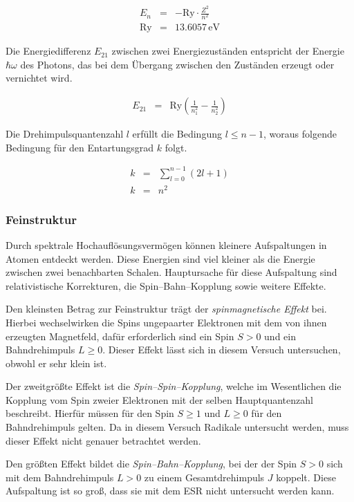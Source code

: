 \documentclass[12pt,a4paper]{scrartcl}
\numberwithin{equation}{section} %
\begin{document}
\begin{eqnarray}
	E_n &=& - \mathrm{Ry} \cdot \frac{Z^2}{n^2} \\
	\mathrm{Ry} &=& 13.6057 \mathrm{\,eV}
\end{eqnarray}

\noindent
Die Energiedifferenz $E_{21}$ zwischen zwei Energiezuständen entspricht der Energie $\hbar\omega$ des Photons, das bei dem Übergang zwischen den Zuständen erzeugt oder vernichtet wird.

\begin{eqnarray}
	E_{21} &=& \mathrm{Ry} \left( \frac{1}{n_1^2} - \frac{1}{n_2^2} \right)
\end{eqnarray}

\noindent
Die Drehimpulsquantenzahl $l$ erfüllt die Bedingung $l \leq n - 1$, woraus folgende Bedingung für den Entartungsgrad $k$ folgt.

\begin{eqnarray}
	k &=& \sum_{l=0}^{n-1} (2l+1) \\
	k &=& n^2
\end{eqnarray}

\subsubsection{Feinstruktur}
Durch spektrale Hochauflösungsvermögen können kleinere Aufspaltungen in Atomen entdeckt werden. Diese Energien sind viel kleiner als die Energie zwischen zwei benachbarten Schalen. Hauptursache für diese Aufspaltung sind relativistische Korrekturen, die Spin--Bahn--Kopplung sowie weitere Effekte. \cite{Weber}

Den kleinsten Betrag zur Feinstruktur trägt der \emph{spinmagnetische Effekt} bei. Hierbei wechselwirken die Spins ungepaarter Elektronen mit dem von ihnen erzeugten Magnetfeld, dafür erforderlich sind ein Spin $S>0$ und ein Bahndrehimpuls $L\geq 0$. Dieser Effekt lässt sich in diesem Versuch untersuchen, obwohl er sehr klein ist.

Der zweitgrößte Effekt ist die \emph{Spin--Spin--Kopplung}, welche im Wesentlichen die Kopplung vom Spin zweier Elektronen mit der selben Hauptquantenzahl beschreibt. Hierfür müssen für den Spin $S\geq 1$ und $L\geq 0$ für den Bahndrehimpuls gelten. Da in diesem Versuch Radikale untersucht werden, muss dieser Effekt nicht genauer betrachtet werden.

Den größten Effekt bildet die \emph{Spin--Bahn--Kopplung}, bei der der Spin $S>0$ sich mit dem Bahndrehimpuls $L>0$ zu einem Gesamtdrehimpuls $J$ koppelt. Diese Aufspaltung ist so groß, dass sie mit dem ESR nicht untersucht werden kann.
\end{document}
